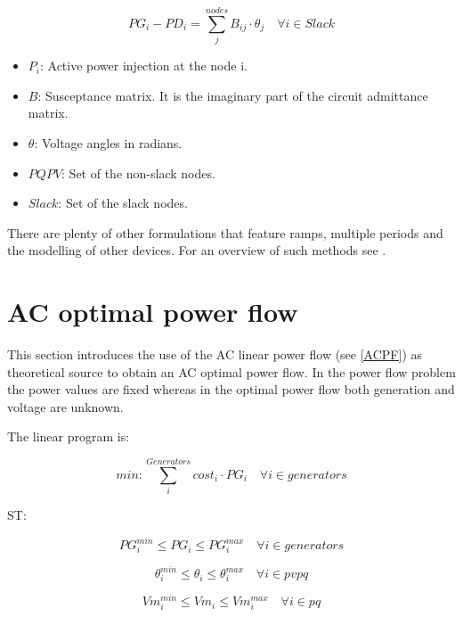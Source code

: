 \documentclass[nols,a4paper,twoside,notoc,fleqn]{tufte-book}
\begin{document}
\begin{equation}
PG_i - PD_i=\sum_j^{nodes} B_{ij} \cdot \theta_j  \quad  \forall i \in Slack
\end{equation}

\begin{itemize}
	\item $P_i$: Active power injection at the node i.
	\item $B$: Susceptance matrix. It is the imaginary part of the circuit admittance matrix.
	\item $\theta$: Voltage angles in radians.
	\item $PQPV$: Set of the non-slack nodes.
	
	\item $Slack$: Set of the slack nodes.
\end{itemize}

There are plenty of other formulations that feature ramps, multiple periods and the modelling of other devices.
For an overview of such methods see \cite{taylor2015convex}.

\newpage
\section{AC optimal power flow}

This section introduces the use of the AC linear power flow (see \ref{ACPF}) as theoretical source to obtain an AC optimal power flow. In the power flow problem the power values are fixed whereas in the optimal power flow both generation and voltage are unknown.

The linear program is:

\begin{equation}
min: \sum_i^{Generators} cost_i \cdot PG_i   \quad \forall i \in generators
\end{equation}

ST:

\begin{equation}
PG_i^{min} \leq PG_i \leq PG_i^{max}  \quad \forall i \in generators
\end{equation}

\begin{equation}
\theta_i^{min} \leq \theta_i \leq \theta_i^{max}  \quad \forall i \in pvpq
\end{equation}

\begin{equation}
Vm_i^{min} \leq Vm_i \leq Vm_i^{max}  \quad \forall i \in pq
\end{equation}
\end{document}

